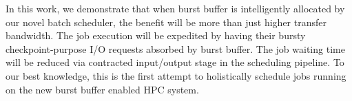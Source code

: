 In this work, we demonstrate that when burst buffer is intelligently allocated 
by our novel batch scheduler,
the benefit will be more than just higher transfer bandwidth.
The job execution will be expedited by having their bursty checkpoint-purpose I/O requests 
absorbed by burst buffer.
The job waiting time will be reduced via
contracted input/output stage in the scheduling pipeline.
To our best knowledge, this is the first attempt to holistically 
schedule jobs running on the new burst buffer enabled HPC system.








